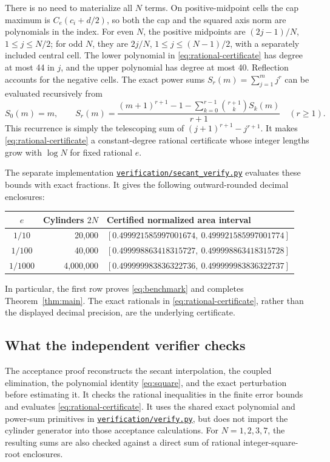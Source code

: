 \documentclass[11pt]{amsart}
\theoremstyle{definition}
\theoremstyle{remark}
\newcommand{\repo}[2]{\href{https://github.com/shjvandekamp/math/blob/main/topics/cylinder-covering/#1}{#2}}
\begin{document}
There is no need to materialize all $N$ terms. On positive-midpoint cells
the cap maximum is $C_e(c_i+d/2)$, so both the cap and the squared axis
norm are polynomials in the index. For even $N$, the positive midpoints
are $(2j-1)/N$, $1\le j\le N/2$; for odd $N$, they are $2j/N$,
$1\le j\le(N-1)/2$, with a separately included central cell.
The lower polynomial in \eqref{eq:rational-certificate} has degree at
most 44 in $j$, and the upper polynomial has degree at most 40.
Reflection accounts for the negative cells. The exact power sums
$S_r(m)=\sum_{j=1}^m j^r$ can be evaluated recursively from
\[
 S_0(m)=m,\qquad
 S_r(m)=\frac{(m+1)^{r+1}-1-
                \sum_{k=0}^{r-1}\binom{r+1}{k}S_k(m)}{r+1}
 \quad(r\ge1).
\]
This recurrence is simply the telescoping sum of
$(j+1)^{r+1}-j^{r+1}$. It makes \eqref{eq:rational-certificate} a
constant-degree rational certificate whose integer lengths grow with
$\log N$ for fixed rational $e$.

The separate implementation
\repo{verification/secant_verify.py}{\texttt{verification/secant\_verify.py}}
evaluates these bounds with exact fractions. It gives the following
outward-rounded decimal enclosures:
\begin{center}
\small
\begin{tabular}{@{}crl@{}}
\toprule
$e$ & Cylinders $2N$ & Certified normalized area interval\\
\midrule
$1/10$ & 20,000 & $[0.499921585997001674,\ 0.499921585997001774]$\\
$1/100$ & 40,000 & $[0.499998863418315727,\ 0.499998863418315728]$\\
$1/1000$ & 4,000,000 & $[0.499999983836322736,\ 0.499999983836322737]$\\
\bottomrule
\end{tabular}
\end{center}
In particular, the first row proves \eqref{eq:benchmark} and completes
Theorem~\ref{thm:main}. The exact rationals in
\eqref{eq:rational-certificate}, rather than the displayed decimal
precision, are the underlying certificate.

\subsection{What the independent verifier checks}
The acceptance proof reconstructs the secant interpolation, the coupled
elimination, the polynomial identity \eqref{eq:square}, and the exact
perturbation before estimating it. It checks the rational inequalities in
the finite error bounds and evaluates \eqref{eq:rational-certificate}.
It uses the shared exact polynomial and power-sum primitives in
\repo{verification/verify.py}{\texttt{verification/verify.py}}, but does
not import the cylinder generator into those acceptance calculations.
For $N=1,2,3,7$, the resulting sums are also checked against a direct sum
of rational integer-square-root enclosures.
\end{document}
